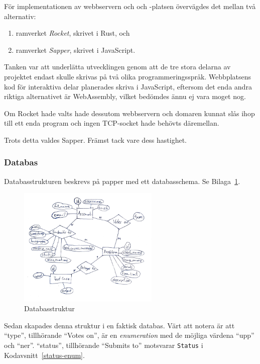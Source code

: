 \documentclass{article}
\renewcommand\listingscaption{Kodavsnitt}
\renewcommand\figurename{Bilaga}
\newcommand{\coderef}[1]{\listingscaption~\ref{#1}}
\begin{document}
För implementationen av webbservern och och -platsen övervägdes det mellan två
alternativ:

\begin{enumerate}
	\item ramverket \textit{Rocket}, skrivet i Rust, och
	\item ramverket \textit{Sapper}, skrivet i JavaScript.
\end{enumerate}

Tanken var att underlätta utvecklingen genom att de tre stora delarna av
projektet endast skulle skrivas på två olika programmeringsspråk. Webbplatsens
kod för interaktiva delar planerades skriva i JavaScript, eftersom det enda
andra riktiga alternativet är WebAssembly, vilket bedömdes ännu ej vara moget
nog.

Om Rocket hade valts hade dessutom webbservern och domaren kunnat slås ihop till
ett enda program och ingen TCP-socket hade behövts däremellan.

Trots detta valdes Sapper. Främst tack vare dess hastighet.

\subsubsection{Databas}

Databasstrukturen beskrevs på papper med ett databasschema. Se
\figurename{}~\ref{dbschema}.

\begin{figure}[H]
	\centering
	\includegraphics[width=0.6\textwidth]{database-schema}
	\caption{Databasstruktur}\label{dbschema}
\end{figure}

Sedan skapades denna struktur i en faktisk databas. Värt att notera är att
``type'', tillhörande ``Votes on'', är en \textit{enumeration} med de möjliga
värdena ``upp'' och ``ner''. ``status'', tillhörande ``Submits to'' motsvarar
\texttt{Status} i \coderef{status-enum}.
\end{document}
